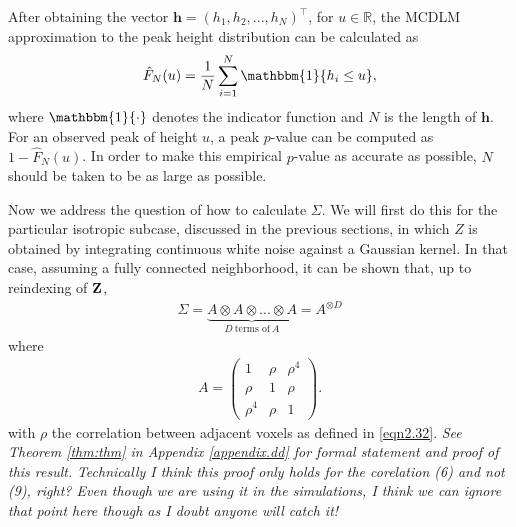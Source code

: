 \documentclass{article}
\newcommand{\nt}[1]{\textit{\color{red} #1}}
\begin{document}
\newpage
After obtaining the vector $\boldsymbol{h} = \left( h_1, h_2,..., h_N \right)^\top$, for $u \in \mathbb{R}$, the MCDLM approximation to the peak height distribution can be calculated as 
\begin{align*}
    \hat{F}_N(u) = \frac{1}{N}\sum_{i=1}^N \mathbbm{1}\{h_i \leq u\},
\end{align*}
where $\mathbbm{1}\{\cdot\}$ denotes the indicator function and $N$ is the length of $\boldsymbol{h}$. For an observed peak of height $u$, a peak $p$-value can be computed as $1 - \hat{F}_N(u)$. In order to make this empirical $p$-value as accurate as possible, $N$ should be taken to be as large as possible. 

Now we address the question of how to calculate $\Sigma$. We will first do this for the particular isotropic subcase, discussed in the previous sections, in which $Z$ is obtained by integrating continuous white noise against a Gaussian kernel. In that case, assuming a fully connected neighborhood, it can be shown that, up to reindexing of $\bf Z$,
\begin{align}
\Sigma = \underbrace{A\otimes A\otimes... \otimes A}_{D\ \text{terms of}\ A} = A^{\otimes D} \label{eqn2.5}
\end{align}
where
\begin{align*}
A = \begin{pmatrix}
1 & \rho & \rho^4\\
\rho & 1 & \rho\\
\rho^4 & \rho & 1
\end{pmatrix}.
\end{align*}
with $\rho$ the correlation between adjacent voxels as defined in \eqref{eqn2.32}. \nt{See Theorem \ref{thm:thm} in Appendix \ref{appendix.dd} for formal statement and proof of this result.}\nt{Technically I think this proof only holds for the corelation (6) and not (9), right? Even though we are using it in the simulations, I think we can ignore that point here though as I doubt anyone will catch it!}
\end{document}
